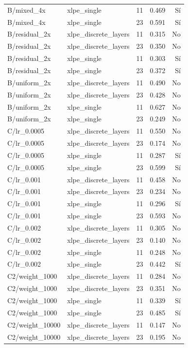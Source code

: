 \begin{longtable}{L{4cm}L{3.5cm}rrr}
B/mixed\_4x & xlpe\_single & 11 & 0.469 & Sí\\
B/mixed\_4x & xlpe\_single & 23 & 0.591 & Sí\\
B/residual\_2x & xlpe\_discrete\_layers & 11 & 0.315 & No\\
B/residual\_2x & xlpe\_discrete\_layers & 23 & 0.350 & No\\
B/residual\_2x & xlpe\_single & 11 & 0.303 & Sí\\
B/residual\_2x & xlpe\_single & 23 & 0.372 & Sí\\
B/uniform\_2x & xlpe\_discrete\_layers & 11 & 0.490 & No\\
B/uniform\_2x & xlpe\_discrete\_layers & 23 & 0.428 & No\\
B/uniform\_2x & xlpe\_single & 11 & 0.627 & No\\
B/uniform\_2x & xlpe\_single & 23 & 0.249 & No\\
C/lr\_0.0005 & xlpe\_discrete\_layers & 11 & 0.550 & No\\
C/lr\_0.0005 & xlpe\_discrete\_layers & 23 & 0.174 & No\\
C/lr\_0.0005 & xlpe\_single & 11 & 0.287 & Sí\\
C/lr\_0.0005 & xlpe\_single & 23 & 0.599 & Sí\\
C/lr\_0.001 & xlpe\_discrete\_layers & 11 & 0.458 & No\\
C/lr\_0.001 & xlpe\_discrete\_layers & 23 & 0.234 & No\\
C/lr\_0.001 & xlpe\_single & 11 & 0.296 & Sí\\
C/lr\_0.001 & xlpe\_single & 23 & 0.593 & No\\
C/lr\_0.002 & xlpe\_discrete\_layers & 11 & 0.305 & No\\
C/lr\_0.002 & xlpe\_discrete\_layers & 23 & 0.140 & No\\
C/lr\_0.002 & xlpe\_single & 11 & 0.248 & No\\
C/lr\_0.002 & xlpe\_single & 23 & 0.442 & Sí\\
C2/weight\_1000 & xlpe\_discrete\_layers & 11 & 0.284 & No\\
C2/weight\_1000 & xlpe\_discrete\_layers & 23 & 0.351 & No\\
C2/weight\_1000 & xlpe\_single & 11 & 0.339 & Sí\\
C2/weight\_1000 & xlpe\_single & 23 & 0.485 & Sí\\
C2/weight\_10000 & xlpe\_discrete\_layers & 11 & 0.147 & No\\
C2/weight\_10000 & xlpe\_discrete\_layers & 23 & 0.195 & No\\

\end{longtable}
